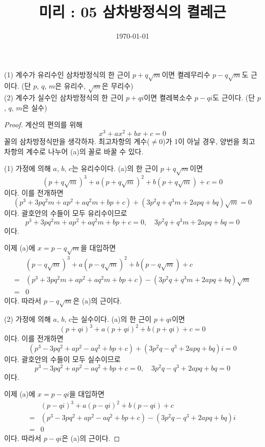 \documentclass{article}
\begin{document}
\title{미리 : 05 삼차방정식의 켤레근}
\author{}
\date{\today}
\maketitle

\noindent
\begin{mdframed}[frametitle={개념원리 수1, p170}]
(1) 계수가 유리수인 삼차방정식의 한 근이 \(p+q\sqrt m\)이면 켤레무리수 \(p-q\sqrt m\)도 근이다.
(단 \(p\), \(q\), \(m\)은 유리수, \(\sqrt m\)은 무리수)
\\
(2) 계수가 실수인 삼차방정식의 한 근이 \(p+qi\)이면 켤레복소수 \(p-qi\)도 근이다.
(단 \(p\), \(q\), \(m\)은 실수)
\end{mdframed}

\begin{proof}
계산의 편의를 위해
\[x^3+ax^2+bx+c=0\tag{a}\]
꼴의 삼차방정식만을 생각하자.
최고차항의 계수(\(\neq0\))가 1이 아닐 경우, 양번을 최고차항의 계수로 나누어 (a)의 꼴로 바꿀 수 있다.

(1) 가정에 의해 \(a\), \(b\), \(c\)는 유리수이다.
(a)의 한 근이 \(p+q\sqrt m\)이면
\[
(p+q\sqrt m)^3+a(p+q\sqrt m)^2+b(p+q\sqrt m)+c=0
\]
이다.
이를 전개하면
\[
(p^3+3pq^2m+ap^2+aq^2m+bp+c)+(3p^2q+q^3m+2apq+bq)\sqrt m=0
\]
이다.
괄호안의 수들이 모두 유리수이므로
\[
p^3+3pq^2m+ap^2+aq^2m+bp+c=0,\quad 3p^2q+q^3m+2apq+bq=0
\]
이다.

이제 (a)에 \(x=p-q\sqrt m\)을 대입하면
\begin{align*}
&(p-q\sqrt m)^3+a(p-q\sqrt m)^2+b(p-q\sqrt m)+c\\
=&(p^3+3pq^2m+ap^2+aq^2m+bp+c)-(3p^2q+q^3m+2apq+bq)\sqrt m\\
=&0
\end{align*}
이다.
따라서 \(p-q\sqrt m\)은 (a)의 근이다.

(2) 가정에 의해 \(a\), \(b\), \(c\)는 실수이다.
(a)의 한 근이 \(p+qi\)이면
\[
(p+qi)^3+a(p+qi)^2+b(p+qi)+c=0
\]
이다.
이를 전개하면
\[
(p^3-3pq^2+ap^2-aq^2+bp+c)+(3p^2q-q^3+2apq+bq)i=0
\]
이다.
괄호안의 수들이 모두 실수이므로
\[
p^3-3pq^2+ap^2-aq^2+bp+c=0,\quad 3p^2q-q^3+2apq+bq=0
\]
이다.

이제 (a)에 \(x=p-qi\)을 대입하면
\begin{align*}
&(p-qi)^3+a(p-qi)^2+b(p-qi)+c\\
=&(p^3-3pq^2+ap^2-aq^2+bp+c)-(3p^2q-q^3+2apq+bq)i\\
=&0
\end{align*}
이다.
따라서 \(p-qi\)은 (a)의 근이다.
\end{proof}
\end{document}
